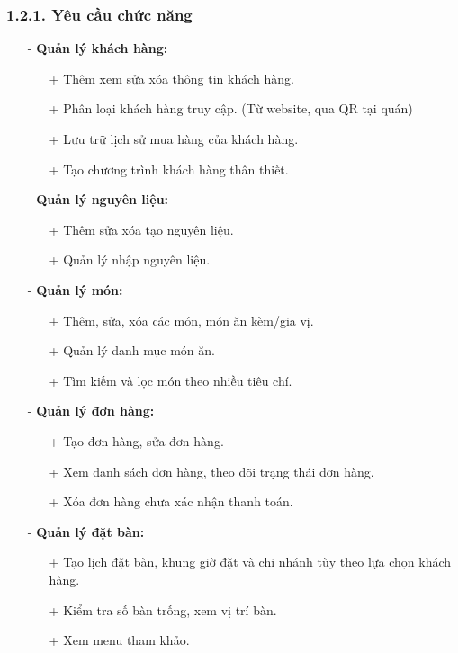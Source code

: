\documentclass[a4paper]{article}
\begin{document}
\subsubsection{1.2.1. Yêu cầu chức năng}
\begin{itemize}
    \item[-] \textbf{Quản lý khách hàng:}
    \begin{itemize}
        \item[+] Thêm xem sửa xóa thông tin khách hàng.
        \item[+] Phân loại khách hàng truy cập. (Từ website, qua QR tại quán)
        \item[+] Lưu trữ lịch sử mua hàng của khách hàng.
        \item[+] Tạo chương trình khách hàng thân thiết.
    \end{itemize}
    \item[-] \textbf{Quản lý nguyên liệu:}
    \begin{itemize}
        \item[+] Thêm sửa xóa tạo nguyên liệu.
        \item[+] Quản lý nhập nguyên liệu.
    \end{itemize}
    \item[-] \textbf{Quản lý món:}
    \begin{itemize}
        \item[+] Thêm, sửa, xóa các món, món ăn kèm/gia vị.
        \item[+] Quản lý danh mục món ăn.
        \item[+] Tìm kiếm và lọc món theo nhiều tiêu chí.
    \end{itemize}
    \item[-] \textbf{Quản lý đơn hàng:}
    \begin{itemize}
        \item[+] Tạo đơn hàng, sửa đơn hàng.
        \item[+] Xem danh sách đơn hàng, theo dõi trạng thái đơn hàng.
        \item[+] Xóa đơn hàng chưa xác nhận thanh toán.
    \end{itemize}
    \item[-] \textbf{Quản lý đặt bàn:}
    \begin{itemize}
        \item[+] Tạo lịch đặt bàn, khung giờ đặt và chi nhánh tùy theo lựa chọn khách hàng.
        \item[+] Kiểm tra số bàn trống, xem vị trí bàn.
        \item[+] Xem menu tham khảo.

\end{itemize}
\end{itemize}
\end{document}
